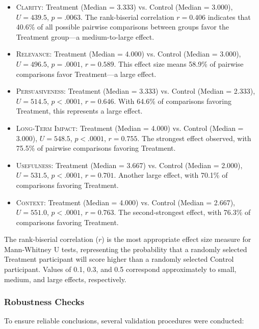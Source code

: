 \begin{itemize}
    \item \textsc{Clarity}: Treatment (Median = 3.333) vs. Control (Median = 3.000), $U = 439.5$, $p = .0063$. The rank-biserial correlation $r = 0.406$ indicates that 40.6\% of all possible pairwise comparisons between groups favor the Treatment group—a medium-to-large effect.
    
    \item \textsc{Relevance}: Treatment (Median = 4.000) vs. Control (Median = 3.000), $U = 496.5$, $p = .0001$, $r = 0.589$. This effect size means 58.9\% of pairwise comparisons favor Treatment—a large effect.
    
    \item \textsc{Persuasiveness}: Treatment (Median = 3.333) vs. Control (Median = 2.333), $U = 514.5$, $p < .0001$, $r = 0.646$. With 64.6\% of comparisons favoring Treatment, this represents a large effect.
    
    \item \textsc{Long-Term Impact}: Treatment (Median = 4.000) vs. Control (Median = 3.000), $U = 548.5$, $p < .0001$, $r = 0.755$. The strongest effect observed, with 75.5\% of pairwise comparisons favoring Treatment.
    
    \item \textsc{Usefulness}: Treatment (Median = 3.667) vs. Control (Median = 2.000), $U = 531.5$, $p < .0001$, $r = 0.701$. Another large effect, with 70.1\% of comparisons favoring Treatment.
    
    \item \textsc{Context}: Treatment (Median = 4.000) vs. Control (Median = 2.667), $U = 551.0$, $p < .0001$, $r = 0.763$. The second-strongest effect, with 76.3\% of comparisons favoring Treatment.
\end{itemize}

The rank-biserial correlation ($r$) is the most appropriate effect size measure for Mann-Whitney U tests, representing the probability that a randomly selected Treatment participant will score higher than a randomly selected Control participant. Values of 0.1, 0.3, and 0.5 correspond approximately to small, medium, and large effects, respectively.

\subsubsection{Robustness Checks}

To ensure reliable conclusions, several validation procedures were conducted:

